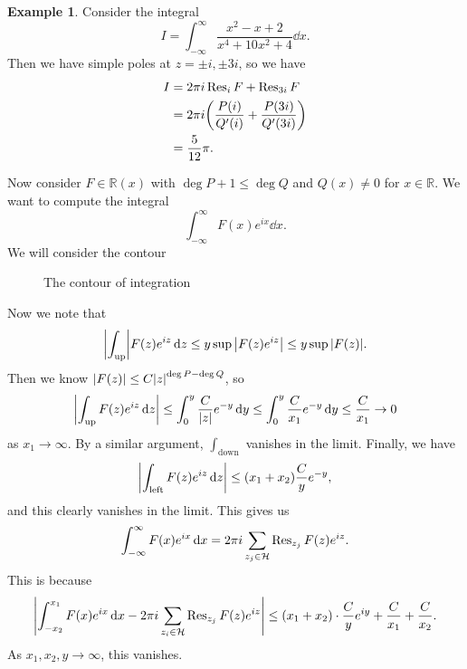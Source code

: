 \documentclass[leqno, openany]{memoir}
\theoremstyle{definition}
\newtheorem{exm}[thm]{Example}
\theoremstyle{remark}
\theoremstyle{plain}
\theoremstyle{definition}
\theoremstyle{remark}
\newcommand{\R}{\mathbb{R}}
\newcommand{\mc}[1]{\mathcal{#1}}
\begin{document}
\begin{exm} Consider the integral \[ I = \int_{-\infty}^{\infty} \frac{x^2 - x
    + 2}{x^4 + 10x^2 + 4} \dd{x}. \] Then we have simple poles at $z = \pm i,
    \pm 3i$, so we have \begin{align*} I &= 2 \pi i \Res_i F + \Res_{3i} F \\
    &= 2 \pi i \qty(\frac{P(i)}{Q'(i)} + \frac{P(3i)}{Q'(3i)}) \\ &=
\frac{5}{12} \pi.  \end{align*} \end{exm}

Now consider $F \in \R(x)$ with $\deg P + 1 \leq \deg Q$ and $Q(x) \neq 0$ for
$x \in \R$. We want to compute the integral \[ \int_{- \infty}^{\infty} F(x)
    e^{ix} \dd{x}. \] We will consider the contour \begin{figure}[H]
    \begin{center}  \end{center} \caption{The
        contour of integration}%
    \end{figure}

Now we note that \[ \abs{\int_{\text{up}}} F(z) e^{iz} \dd{z} \leq y \sup
    \abs{F(z) e^{iz}} \leq y \sup \abs{F(z)}. \] Then we know $\abs{F(z)} \leq
    C \abs{z}^{\deg P - \deg Q}$, so \[ \abs{\int_{\text{up}} F(z) e^{iz}
    \dd{z}} \leq \int_0^y \frac{C}{\abs{z}} e^{-y} \dd{y} \leq \int_0^y
\frac{C}{x_1} e^{-y} \dd{y} \leq \frac{C}{x_1} \to 0 \] as $x_1 \to \infty$. By
a similar argument, $\int_{\text{down}}$ vanishes in the limit. Finally, we
have \[ \abs{\int_{\text{left}} F(z) e^{iz} \dd{z}} \leq (x_1 + x_2)
\frac{C}{y} e^{-y}, \] and this clearly vanishes in the limit. This gives us \[
\int_{- \infty}^{\infty} F(x) e^{ix} \dd{x} = 2 \pi i \sum_{{z_j \in \mc{H}}}
\Res_{z_j} F(z) e^{iz}. \] This is because \[ \abs{\int_{-x_2}^{x_1} F(x)
e^{ix} \dd{x} - 2 \pi i \sum_{z_i \in \mc{H}} \Res_{z_j} F(z)e^{iz}} \leq (x_1
+ x_2) \cdot \frac{C}{y}e^{iy} + \frac{C}{x_1} + \frac{C}{x_2}. \] As $x_1,
x_2, y \to \infty$, this vanishes.
\end{document}
